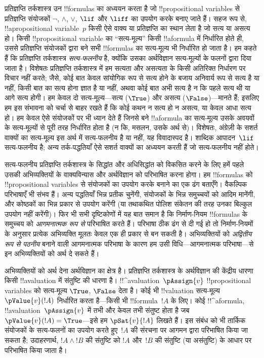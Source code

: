\documentclass[../../../include/open-logic-section]{subfiles}
\begin{document}


प्रतिज्ञप्ति तर्कशास्त्र उन !!{formula}s का अध्ययन करता है जो
!!{propositional variable}s से प्रतिज्ञप्ति संयोजकों $\lnot$, $\land$,
$\lor$, $\lif$ और $\liff$ का उपयोग करके बनाए जाते हैं। सहज रूप से,
!!a{propositional variable}~$p$ किसी ऐसे वाक्य या प्रतिज्ञप्ति का स्थान लेता
है जो सत्य या असत्य हो। किसी !!{propositional variable} का ``सत्य-मूल्य''
किसी !!a{formula} में निर्धारित होते ही, उससे प्रतिज्ञप्ति संयोजकों द्वारा बने
सभी !!{formula}s का सत्य-मूल्य भी निर्धारित हो जाता है। हम कहते हैं कि
प्रतिज्ञप्ति तर्कशास्त्र \emph{सत्य-फलनीय} है, क्योंकि उसका अर्थविज्ञान
सत्य-मूल्यों के फलनों द्वारा दिया जाता है। विशेषतः प्रतिज्ञप्ति तर्कशास्त्र में
हम सत्यता और असत्यता के किसी अतिरिक्त निर्धारण पर विचार नहीं करते; जैसे, कोई
बात केवल सांयोगिक रूप से सत्य होने के बजाय अनिवार्य रूप से सत्य है या नहीं,
किसी बात का सत्य होना ज्ञात है या नहीं, अथवा कोई बात अभी सत्य है न कि पहले
सत्य थी या आगे सत्य होगी। हम केवल दो सत्य-मूल्य—सत्य ($\True$) और असत्य
($\False$)—मानते हैं; इसलिए हम इस संभावना को चर्चा से बाहर रखते हैं कि कोई
कथन न सत्य हो न असत्य, या केवल आधा सत्य हो। हम केवल ऐसे संयोजकों पर भी ध्यान
देते हैं जिनसे बने !!a{formula} का सत्य-मूल्य उसके अवयवों के सत्य-मूल्यों से
पूरी तरह निर्धारित होता है (न कि, मसलन, उसके अर्थ से)। विशेषतः, अंग्रेज़ी के
सशर्त वाक्यों का सत्य-मूल्य इस अर्थ में सत्य-फलनीय है या नहीं, यह विवादास्पद
है। शाब्दिक आपादन~$\lif$ सत्य-फलनीय है; अन्य तर्क-पद्धतियाँ ऐसे सशर्त वाक्यों
का अध्ययन करती हैं जो सत्य-फलनीय नहीं होते।

सत्य-फलनीय प्रतिज्ञप्ति तर्कशास्त्र के सिद्धांत और अधिसिद्धांत को विकसित करने
के लिए हमें पहले उसकी अभिव्यक्तियों के वाक्यविन्यास और अर्थविज्ञान को परिभाषित
करना होगा। हम !!{formula}s को !!{propositional variable}s से संयोजकों का
उपयोग करके बनाने का एक ढंग बताएँगे। वैकल्पिक परिभाषाएँ भी संभव हैं। अन्य
पद्धतियाँ भिन्न प्रतीक चुनेंगी, संयोजकों के भिन्न समुच्चयों को आदिम मानेंगी,
और कोष्ठकों का भिन्न प्रकार से उपयोग करेंगी (या तथाकथित पोलिश संकेतन की तरह
उनका बिल्कुल उपयोग नहीं करेंगी)। फिर भी सभी दृष्टिकोणों में यह बात समान है कि
निर्माण-नियम !!{formula}s के समुच्चय को \emph{आगमनात्मक रूप से} परिभाषित करते
हैं। परिभाषा ठीक ढंग से दी गई हो तो निर्माण-नियमों के अनुसार प्रत्येक
अभिव्यक्ति मूलतः केवल एक ही प्रकार से बन सकती है। अभिव्यक्तियों को
\emph{अद्वितीय रूप से पठनीय} बनाने वाली आगमनात्मक परिभाषा के कारण हम उसी
विधि—आगमनात्मक परिभाषा—से इन अभिव्यक्तियों को अर्थ दे सकते हैं।

अभिव्यक्तियों को अर्थ देना अर्थविज्ञान का क्षेत्र है। प्रतिज्ञप्ति तर्कशास्त्र
के अर्थविज्ञान की केंद्रीय धारणा किसी !!a{valuation} में संतुष्टि की धारणा है।
!!^a{valuation}~$\pAssign{v}$ !!{propositional variable}s को सत्य-मूल्य
$\True$, $\False$ देता है। कोई भी !!{valuation} सत्य-मूल्य $\pValue{v}(!A)$
निर्धारित करता है—किसी भी !!{formula}~$!A$ के लिए। कोई !!^a{formula},
!!a{valuation}~$\pAssign{v}$ में तभी और केवल तभी संतुष्ट होता है जब
$\pValue{v}(!A) = \True$—इसे हम $\pSat{v}{!A}$ लिखते हैं। इस संबंध को भी
तार्किक संयोजकों के सत्य-फलनों का उपयोग करते हुए~$!A$ की संरचना पर आगमन द्वारा
परिभाषित किया जा सकता है; उदाहरणार्थ, $!A \land !B$ की संतुष्टि को $!A$ और~$!B$
की संतुष्टि (या असंतुष्टि) के आधार पर परिभाषित किया जाता है।
\end{document}
